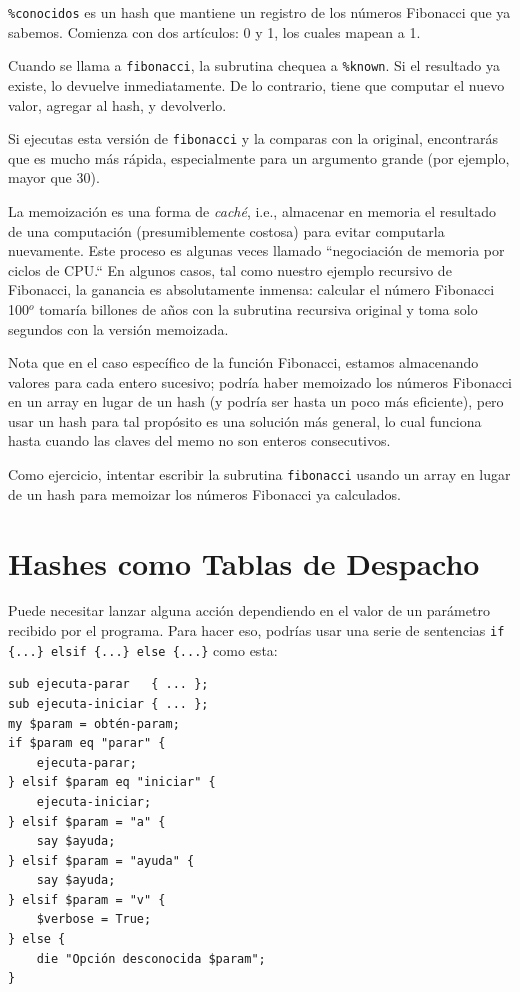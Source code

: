 \verb|%conocidos| es un hash que mantiene un registro
de los números Fibonacci que ya sabemos. Comienza con dos
artículos: 0 y 1, los cuales mapean a 1.

Cuando se llama a {\tt fibonacci}, la subrutina chequea a
\verb|%known|. Si el resultado ya existe, lo devuelve inmediatamente.
De lo contrario, tiene que computar el nuevo valor, 
agregar al hash, y devolverlo.

Si ejecutas esta versión de {\tt fibonacci} y la comparas con
la original, encontrarás que es mucho más rápida, especialmente
para un argumento grande (por ejemplo, mayor que 30).

La memoización es una forma de \emph{caché}, i.e., almacenar en 
memoria el resultado de una computación (presumiblemente costosa)
para evitar computarla nuevamente. Este proceso es algunas veces 
llamado ``negociación de memoria por ciclos de CPU.`` En algunos 
casos, tal como nuestro ejemplo recursivo de Fibonacci, la ganancia
es absolutamente inmensa: calcular el número Fibonacci 100$^{o}$
tomaría billones de años con la subrutina recursiva original
y toma solo segundos con la versión memoizada. 

Nota que en el caso específico de la función Fibonacci,
estamos almacenando valores para cada entero sucesivo; podría
haber memoizado los números Fibonacci en un array en lugar de 
un hash (y podría ser hasta un poco más eficiente), pero usar
un hash para tal propósito es una solución más general, 
lo cual funciona hasta cuando las claves del memo no son
enteros consecutivos.

Como ejercicio, intentar escribir la subrutina {\tt fibonacci}
usando un array en lugar de un hash para memoizar los números
Fibonacci ya calculados.


\section{Hashes como Tablas de Despacho}
\label{dispatch}

Puede necesitar lanzar alguna acción dependiendo en el valor
de un parámetro recibido por el programa. Para hacer eso,
podrías usar una serie de sentencias
\verb'if {...} elsif {...} else {...}' como esta:

\begin{lstlisting}
sub ejecuta-parar   { ... };
sub ejecuta-iniciar { ... };
my $param = obtén-param;
if $param eq "parar" {
    ejecuta-parar;
} elsif $param eq "iniciar" {
    ejecuta-iniciar;
} elsif $param = "a" {
    say $ayuda;
} elsif $param = "ayuda" {
    say $ayuda;
} elsif $param = "v" {
    $verbose = True;
} else {
    die "Opción desconocida $param";
}
\end{lstlisting}

